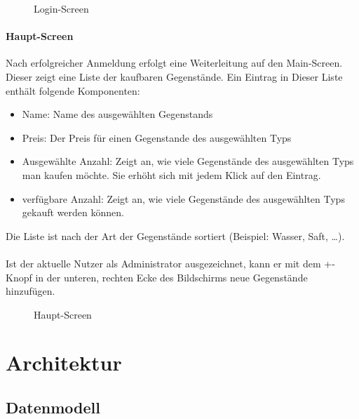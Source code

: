 \documentclass{scrartcl}
\begin{document}
		\begin{figure}[!h]
			\label{loginscreen}
			\centering
			\caption{Login-Screen}
		\end{figure}
	
		\paragraph*{Haupt-Screen}
		Nach erfolgreicher Anmeldung erfolgt eine Weiterleitung auf den Main-Screen. Dieser zeigt eine Liste der kaufbaren Gegenstände. Ein Eintrag in Dieser Liste enthält folgende Komponenten:
		
		\begin{itemize}
			\item Name: Name des ausgewählten Gegenstands
			
			\item Preis: Der Preis für einen Gegenstande des ausgewählten Typs
			
			\item Ausgewählte Anzahl: Zeigt an, wie viele Gegenstände des ausgewählten Typs man kaufen möchte. Sie erhöht sich mit jedem Klick auf den Eintrag.
			
			\item verfügbare Anzahl: Zeigt an, wie viele Gegenstände des ausgewählten Typs gekauft werden können. 
		\end{itemize}
	
		Die Liste ist nach der Art der Gegenstände sortiert (Beispiel: Wasser, Saft, \ldots).
		
		\paragraph*{}
		Ist der aktuelle Nutzer als Administrator ausgezeichnet, kann er mit dem +-Knopf in der unteren, rechten Ecke des Bildschirms neue Gegenstände hinzufügen.
		
		\begin{figure}[!h]
			\label{mainscreen}
			\centering
			\caption{Haupt-Screen}
		\end{figure}
		
	
	\section{Architektur} \label{architecture}
		\subsection{Datenmodell} \label{architecture.datamodel}
\end{document}
